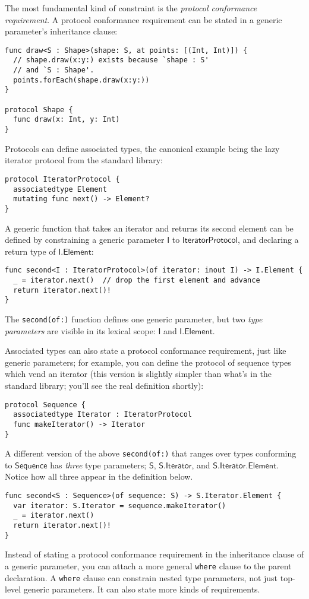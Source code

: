\documentclass[headsepline,bibliography=totoc]{scrreport}
\newcommand{\namesym}[1]{\mathsf{#1}}
\newcommand{\genericparam}[1]{\bm{\mathsf{#1}}}
\newcommand{\proto}[1]{\bm{\mathsf{#1}}}
\theoremstyle{definition}
\theoremstyle{definition}
\theoremstyle{definition}
\begin{document}
The most fundamental kind of constraint is the \emph{protocol conformance requirement}. A protocol conformance requirement can be stated in a generic parameter's inheritance clause:
\begin{Verbatim}
func draw<S : Shape>(shape: S, at points: [(Int, Int)]) {
  // shape.draw(x:y:) exists because `shape : S'
  // and `S : Shape'.
  points.forEach(shape.draw(x:y:))
}

protocol Shape {
  func draw(x: Int, y: Int)
}
\end{Verbatim}

Protocols can define associated types, the canonical example being the lazy iterator protocol from the standard library:
\begin{Verbatim}
protocol IteratorProtocol {
  associatedtype Element
  mutating func next() -> Element?
}
\end{Verbatim}
A generic function that takes an iterator and returns its second element can be defined by constraining a generic parameter $\genericparam{I}$ to $\proto{IteratorProtocol}$, and declaring a return type of $\genericparam{I}.\namesym{Element}$:
\begin{Verbatim}
func second<I : IteratorProtocol>(of iterator: inout I) -> I.Element {
  _ = iterator.next()  // drop the first element and advance
  return iterator.next()!
}
\end{Verbatim}
The \texttt{second(of:)} function defines one generic parameter, but two \emph{type parameters} are visible in its lexical scope: $\genericparam{I}$ and $\genericparam{I}.\namesym{Element}$.

Associated types can also state a protocol conformance requirement, just like generic parameters; for example, you can define the protocol of sequence types which vend an iterator (this version is slightly simpler than what's in the standard library; you'll see the real definition shortly):
\begin{Verbatim}
protocol Sequence {
  associatedtype Iterator : IteratorProtocol
  func makeIterator() -> Iterator
}
\end{Verbatim}
A different version of the above \texttt{second(of:)} that ranges over types conforming to $\proto{Sequence}$ has \emph{three} type parameters; $\genericparam{S}$, $\genericparam{S}.\namesym{Iterator}$, and $\genericparam{S}.\namesym{Iterator}.\namesym{Element}$. Notice how all three appear in the definition below.
\begin{Verbatim}
func second<S : Sequence>(of sequence: S) -> S.Iterator.Element {
  var iterator: S.Iterator = sequence.makeIterator()
  _ = iterator.next()
  return iterator.next()!
}
\end{Verbatim}
Instead of stating a protocol conformance requirement in the inheritance clause of a generic parameter, you can attach a more general \texttt{where} clause to the parent declaration. A \texttt{where} clause can constrain nested type parameters, not just top-level generic parameters. It can also state more kinds of requirements.
\end{document}

